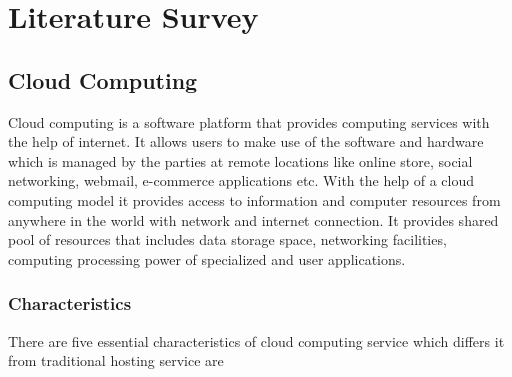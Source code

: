 \chapter{Literature Survey}

    \section{Cloud Computing}
    
    \par Cloud computing is a software platform that provides computing services with the help of internet. It allows users to make use of the software and hardware which is managed by the parties at remote locations like online store, social networking, webmail, e-commerce applications etc. With the help of a cloud computing model it provides access to information and computer resources from anywhere in the world with network and internet connection. It provides shared pool of resources that includes data storage space, networking facilities, computing processing power of specialized and user applications\cite{deploy}.%
    
    \subsection{Characteristics}
    There are five essential characteristics of cloud computing service which differs it from traditional hosting service are
    
